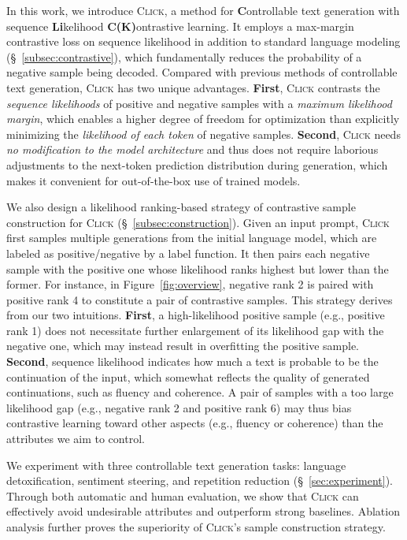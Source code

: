In this work, we introduce \textsc{Click}, a method for \textbf{C}ontrollable text generation with sequence \textbf{Li}kelihood \textbf{C(K)}ontrastive learning. It employs a max-margin contrastive loss on sequence likelihood in addition to standard language modeling (\S~\ref{subsec:contrastive}), which fundamentally reduces the probability of a negative sample being decoded. Compared with previous methods of controllable text generation, \textsc{Click} has two unique advantages.
\textbf{First}, \textsc{Click} contrasts the \textit{sequence likelihoods} of positive and negative samples with a \textit{maximum likelihood margin}, which enables a higher degree of freedom for optimization than explicitly minimizing the \textit{likelihood of each token} of negative samples.
\textbf{Second}, \textsc{Click} needs \textit{no modification to the model architecture} and thus does not require laborious adjustments to the next-token prediction distribution during generation, which makes it convenient for out-of-the-box use of trained models.

We also design a likelihood ranking-based strategy of contrastive sample construction for \textsc{Click} (\S~\ref{subsec:construction}).
Given an input prompt, \textsc{Click} first samples multiple generations from the initial language model, which are labeled as \colorbox{positive}{positive}/\colorbox{negative}{negative} by a label function. It then pairs each negative sample with the positive one whose likelihood ranks highest but lower than the former. For instance, in Figure~\ref{fig:overview}, \colorbox{negative}{negative rank 2} is paired with \colorbox{positive}{positive rank 4} to constitute a pair of contrastive samples. This strategy derives from our two intuitions.
\textbf{First}, a high-likelihood positive sample (e.g., \colorbox{positive}{positive rank 1}) does not necessitate further enlargement of its likelihood gap with the negative one, which may instead result in overfitting the positive sample.
\textbf{Second}, sequence likelihood indicates how much a text is probable to be the continuation of the input, which somewhat reflects the quality of generated continuations, such as fluency and coherence. A pair of samples with a too large likelihood gap (e.g., \colorbox{negative}{negative rank 2} and \colorbox{positive}{positive rank 6}) may thus bias contrastive learning toward other aspects (e.g., fluency or coherence) than the attributes we aim to control.

We experiment with three controllable text generation tasks: language detoxification, sentiment steering, and repetition reduction (\S~\ref{sec:experiment}).
Through both automatic and human evaluation, we show that \textsc{Click} can effectively avoid undesirable attributes and outperform strong baselines. Ablation analysis further proves the superiority of \textsc{Click}'s sample construction strategy.

